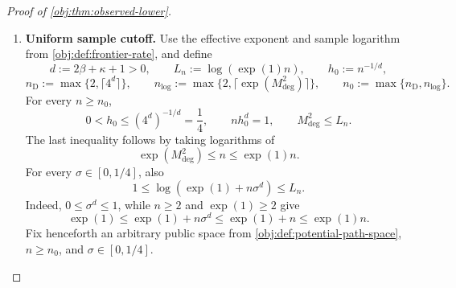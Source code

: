 \documentclass[11pt]{article}
\begin{document}
\begin{proof}[Proof of \cref{obj:thm:observed-lower}]
\begin{enumerate}
Define the design coefficient and three comparison constants by
\[
c_\kappa:=(\kappa+1)2^\kappa,\qquad
B_{\mathrm D}:=8c_\kappa,\qquad
B_{\mathrm I}:=4\exp(1/2)(c_\kappa C_{\mathrm{packet}})^2,\qquad
B_{\mathrm G}:=4\exp(1/2)(2c_\kappa)^2,
\]
and set
\[
B_{\mathrm{amp}}:=\max\{B_{\mathrm D},2B_{\mathrm I}\},\qquad
\varepsilon:=
\min\left\{
\frac18,\frac{1}{8C_{\mathrm{packet}}},
\sqrt{\frac{\log(1+\tau^2)}{B_{\mathrm{amp}}}}
\right\}.
\]
These constants are positive. The amplitude satisfies
\[
\varepsilon\le\frac18,\qquad
4\varepsilon\le1,\qquad
\varepsilon C_{\mathrm{packet}}\le\frac18,
\]
\[
B_{\mathrm D}\varepsilon^2\le\log(1+\tau^2),
\qquad
2B_{\mathrm I}\varepsilon^2\le\log(1+\tau^2).
\]
Finally, choose
\[
C:=\varepsilon^2\max\{B_{\mathrm G},B_{\mathrm I}\},
\qquad
c:=2\varepsilon\min\left\{
1,
\left(\frac{a_{\mathrm I}}{\sqrt{C_{\mathrm I}+1}}\right)^\beta,
\left(\frac{\ell_{\mathrm M}}{2C_{\mathrm M}}\right)^\beta
\right\}.
\]
Both are positive, and these definitions give the comparison constants required in each regime.

\item \textbf{Uniform sample cutoff.}
Use the effective exponent and sample logarithm from \cref{obj:def:frontier-rate}, and define
\[
d:=2\beta+\kappa+1>0,\qquad
L_n:=\log(\exp(1)n),\qquad h_0:=n^{-1/d},
\]
\[
n_{\mathrm D}:=\max\{2,\lceil4^d\rceil\},\qquad
n_{\log}:=\max\{2,\lceil\exp(M_{\mathrm{deg}}^2)\rceil\},
\qquad
n_0:=\max\{n_{\mathrm D},n_{\log}\}.
\]
For every \(n\ge n_0\),
\[
0<h_0\le(4^d)^{-1/d}=\frac14,\qquad
nh_0^d=1,\qquad
M_{\mathrm{deg}}^2\le L_n.
\]
The last inequality follows by taking logarithms of
\[
\exp(M_{\mathrm{deg}}^2)\le n\le\exp(1)n.
\]
For every \(\sigma\in[0,1/4]\), also
\[
1\le\log(\exp(1)+n\sigma^d)\le L_n.
\]
Indeed, \(0\le\sigma^d\le1\), while \(n\ge2\) and \(\exp(1)\ge2\) give
\[
\exp(1)\le\exp(1)+n\sigma^d
\le\exp(1)+n\le\exp(1)n.
\]
Fix henceforth an arbitrary public space from \cref{obj:def:potential-path-space}, \(n\ge n_0\), and \(\sigma\in[0,1/4]\).


\end{enumerate}
\end{proof}
\end{document}
